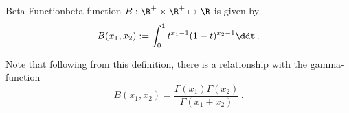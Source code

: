 \begin{definition}{Beta Function}{beta-function}
  $B: \R^+\times\R^+ \mapsto \R$ is given by
  $$B(x_1, x_2) := \int_0^1 t^{x_1-1}(1-t)^{x_2-1} \ddt\,.$$
\end{definition}

Note that following from this definition, there is a relationship with the gamma-function
\begin{equation}
  B(x_1, x_2) = \frac{\Gamma(x_1) \Gamma(x_2)}{\Gamma(x_1 + x_2)}\,.
  \label{eq:beta-gamma}
\end{equation}
